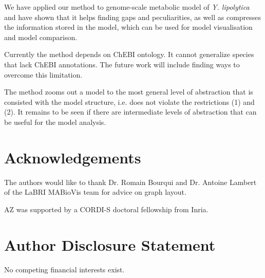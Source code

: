 \documentclass[9pt]{article}
\newcounter{fig}
\newcounter{rm}
\begin{document}
We have applied our method to genome-scale metabolic model of \emph{Y. lipolytica} and have shown that it helps finding gaps and peculiarities, as well as compresses the information stored in the model, which can be used for model visualisation and model comparison.

Currently the method depends on ChEBI ontology. It cannot generalize species that lack ChEBI annotations. The future work will include finding ways to overcome this limitation.

The method zooms out a model to the most general level of abstraction that is consisted with the model structure, i.e. does not violate the restrictions (1) and (2). It remains to be seen if there are intermediate levels of abstraction that can be useful for the model analysis. 

\bigskip

\section*{Acknowledgements}
  The authors would like to thank Dr. Romain Bourqui and Dr. Antoine Lambert of the LaBRI MABioVis team for advice on graph layout.
  
  AZ was supported by a CORDI-S doctoral fellowship from Inria.

\section*{Author Disclosure Statement}
No competing financial interests exist.

\newpage
 




%
%      
\end{document}
